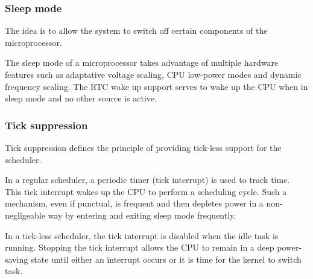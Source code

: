 \subsubsection{Sleep mode}
The idea is to allow the system to switch off certain components of the mi\-cro\-pro\-ces\-sor.

The sleep mode of a microprocessor takes advantage of multiple hardware features
    such as adaptative voltage scaling, CPU low-power modes and dynamic frequency scaling.
The RTC wake up support serves to wake up the CPU when in sleep mode and no other source is active.

\subsubsection{Tick suppression}
Tick suppression defines the principle of providing tick-less support for the scheduler.

In a regular scheduler, a periodic timer (tick interrupt) is used to track time.
This tick interrupt wakes up the CPU to perform a scheduling cycle.
Such a mechanism, even if punctual, is frequent and then depletes power in a non-negligeable way by entering and exiting sleep mode frequently\cite{freertos-tick-supp}.

In a tick-less scheduler, the tick interrupt is disabled when the idle task is running.
Stopping the tick interrupt allows the CPU to remain in a deep power-saving state 
    until either an interrupt occurs or it is time for the kernel to switch task.

